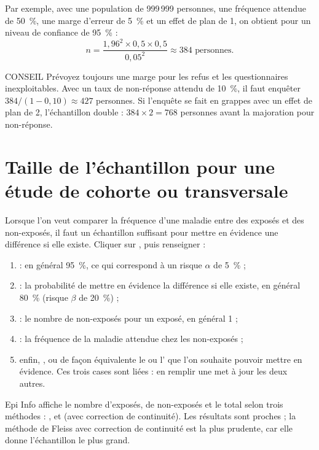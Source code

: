 Par exemple, avec une population de 999\,999 personnes, une fréquence attendue de 50~\%, une marge d'erreur de 5~\% et un effet de plan de 1, on obtient pour un niveau de confiance de 95~\% :
\[
n = \frac{1{,}96^2 \times 0{,}5 \times 0{,}5}{0{,}05^2} \approx 384 \text{ personnes.}
\]

\begin{mybox}[colbacktitle=TIP]{\faLightbulb{} CONSEIL}
Prévoyez toujours une marge pour les refus et les questionnaires inexploitables. Avec un taux de non-réponse attendu de 10~\%, il faut enquêter $384/(1-0{,}10) \approx 427$ personnes. Si l'enquête se fait en grappes avec un effet de plan de 2, l'échantillon double : $384 \times 2 = 768$ personnes avant la majoration pour non-réponse.
\end{mybox}

\section[Taille de l'échantillon pour une étude de cohorte ou transversale][Échantillon : cohorte ou transversale]{Taille de l'échantillon pour une étude de cohorte ou transversale}

Lorsque l'on veut comparer la fréquence d'une maladie entre des exposés et des non-exposés, il faut un échantillon suffisant pour mettre en évidence une différence si elle existe. Cliquer sur , puis renseigner :

\begin{enumerate}
	\item {} : en général 95~\%, ce qui correspond à un risque $\alpha$ de 5~\% ;
	\item {} : la probabilité de mettre en évidence la différence si elle existe, en général 80~\% (risque $\beta$ de 20~\%) ;
	\item {} : le nombre de non-exposés pour un exposé, en général 1 ;
	\item {} : la fréquence de la maladie attendue chez les non-exposés ;
	\item enfin, , ou de façon équivalente le  ou l' que l'on souhaite pouvoir mettre en évidence. Ces trois cases sont liées : en remplir une met à jour les deux autres.
\end{enumerate}

Epi Info affiche le nombre d'exposés, de non-exposés et le total selon trois méthodes : ,  et  (avec correction de continuité). Les résultats sont proches ; la méthode de Fleiss avec correction de continuité est la plus prudente, car elle donne l'échantillon le plus grand.

